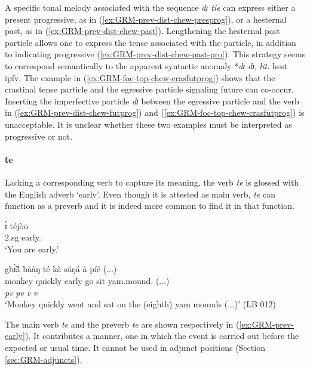\begin{exe}
\begin{exe}
\begin{exe}
{\begin{exe}
\begin{exe}
\begin{exe}
\begin{exe}
\begin{exe}
\begin{exe}
\begin{exe}
\begin{xlist}
\begin{exe}
\begin{exe}
\begin{exe}
\begin{exe}
\begin{exe}
\begin{exe}
\begin{exe}
\begin{exe}
\begin{exe}
\begin{exe}
\begin{exe}
\begin{exe}
\begin{exe}
\begin{exe}
\z 
 \z 
 
 
A specific tonal melody associated with  the sequence {\it dɪ tie} can express 
either a present progressive, as in (\ref{ex:GRM-prev-dist-chew-presprog}),  or 
a hesternal past, as in  (\ref{ex:GRM-prev-dist-chew-past}). Lengthening the 
hesternal past particle allows one to express the tense associated with the 
particle, in addition to indicating  progressive 
(\ref{ex:GRM-prev-dist-chew-past-pro}). This strategy seems to correspond 
semantically  to the apparent syntactic anomaly *{\it dɪ dɪ},  {\it lit.} {\sc 
 hest} {\sc ipfv}.  The example in (\ref{ex:GRM-foc-top-chew-crasfutprog}) 
shows that the crastinal tense particle and the egressive particle signaling  
future  can co-occur.  Inserting the imperfective particle {\it  dɪ} between 
the egressive particle and the verb in  (\ref{ex:GRM-prev-dist-chew-futprog}) 
and (\ref{ex:GRM-foc-top-chew-crasfutprog}) is  unacceptable. It is unclear 
whether these two examples must be interpreted as progressive or not.  



\paragraph{te}
\label{sec:GRM-preverb-te}

Lacking a corresponding verb to capture its meaning, the verb {\it te} is 
glossed
with
the English adverb `early'. Even though  it is attested as main verb,  {\it te}
can  function  as a preverb and it is indeed more common to find it in that
function. 


 \ea\label{ex:GRM-prev-early}
 \ea
\gll  ɪ̀ téjòō\\
     {\sc 2.sg} early.{\foc}   \\
\glt  `You are early.'


\glll gbɪ̃̀ã́           bààŋ         té      kà           sáŋá   à   
píé  {(...)}\\
monkey    quickly   early   go     sit    {\art}
yam.mound.{\pl}   {(...)} \\
{} {\it pv} {\it pv}  {\it v} {\it v} {}  {} {} \\
\glt `Monkey quickly went and sat on the (eighth) yam mounds (...)'  (LB 012)
\z
\z




The main verb {\it te}
and the preverb {\it te} are shown respectively in  
(\ref{ex:GRM-prev-early}).  It contributes a manner, 
one in which the
event is carried out before the expected or usual time.  It cannot be used  in 
adjunct positions (Section
\ref{sec:GRM-adjuncts}).  




\end{exe}
\end{exe}
\end{exe}
\end{exe}
\end{exe}
\end{exe}
\end{exe}
\end{exe}
\end{exe}
\end{exe}
\end{exe}
\end{exe}
\end{exe}
\end{exe}
\end{xlist}
\end{exe}
\end{exe}
\end{exe}
\end{exe}
\end{exe}
\end{exe}
\end{exe}}
\end{exe}
\end{exe}
\end{exe}

